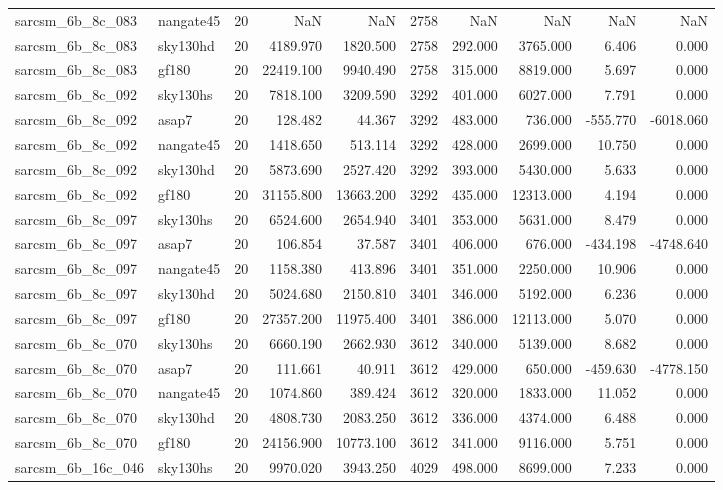 \begin{tabular}{llrrrrrrrr}
sarcsm\_6b\_8c\_083 & nangate45 & 20 & NaN & NaN & 2758 & NaN & NaN & NaN & NaN \\
sarcsm\_6b\_8c\_083 & sky130hd & 20 & 4189.970 & 1820.500 & 2758 & 292.000 & 3765.000 & 6.406 & 0.000 \\
sarcsm\_6b\_8c\_083 & gf180 & 20 & 22419.100 & 9940.490 & 2758 & 315.000 & 8819.000 & 5.697 & 0.000 \\
sarcsm\_6b\_8c\_092 & sky130hs & 20 & 7818.100 & 3209.590 & 3292 & 401.000 & 6027.000 & 7.791 & 0.000 \\
sarcsm\_6b\_8c\_092 & asap7 & 20 & 128.482 & 44.367 & 3292 & 483.000 & 736.000 & -555.770 & -6018.060 \\
sarcsm\_6b\_8c\_092 & nangate45 & 20 & 1418.650 & 513.114 & 3292 & 428.000 & 2699.000 & 10.750 & 0.000 \\
sarcsm\_6b\_8c\_092 & sky130hd & 20 & 5873.690 & 2527.420 & 3292 & 393.000 & 5430.000 & 5.633 & 0.000 \\
sarcsm\_6b\_8c\_092 & gf180 & 20 & 31155.800 & 13663.200 & 3292 & 435.000 & 12313.000 & 4.194 & 0.000 \\
sarcsm\_6b\_8c\_097 & sky130hs & 20 & 6524.600 & 2654.940 & 3401 & 353.000 & 5631.000 & 8.479 & 0.000 \\
sarcsm\_6b\_8c\_097 & asap7 & 20 & 106.854 & 37.587 & 3401 & 406.000 & 676.000 & -434.198 & -4748.640 \\
sarcsm\_6b\_8c\_097 & nangate45 & 20 & 1158.380 & 413.896 & 3401 & 351.000 & 2250.000 & 10.906 & 0.000 \\
sarcsm\_6b\_8c\_097 & sky130hd & 20 & 5024.680 & 2150.810 & 3401 & 346.000 & 5192.000 & 6.236 & 0.000 \\
sarcsm\_6b\_8c\_097 & gf180 & 20 & 27357.200 & 11975.400 & 3401 & 386.000 & 12113.000 & 5.070 & 0.000 \\
sarcsm\_6b\_8c\_070 & sky130hs & 20 & 6660.190 & 2662.930 & 3612 & 340.000 & 5139.000 & 8.682 & 0.000 \\
sarcsm\_6b\_8c\_070 & asap7 & 20 & 111.661 & 40.911 & 3612 & 429.000 & 650.000 & -459.630 & -4778.150 \\
sarcsm\_6b\_8c\_070 & nangate45 & 20 & 1074.860 & 389.424 & 3612 & 320.000 & 1833.000 & 11.052 & 0.000 \\
sarcsm\_6b\_8c\_070 & sky130hd & 20 & 4808.730 & 2083.250 & 3612 & 336.000 & 4374.000 & 6.488 & 0.000 \\
sarcsm\_6b\_8c\_070 & gf180 & 20 & 24156.900 & 10773.100 & 3612 & 341.000 & 9116.000 & 5.751 & 0.000 \\
sarcsm\_6b\_16c\_046 & sky130hs & 20 & 9970.020 & 3943.250 & 4029 & 498.000 & 8699.000 & 7.233 & 0.000 \\

\end{tabular}
